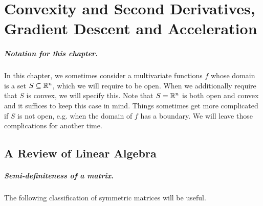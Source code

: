 \chapter{Convexity and Second Derivatives,
  Gradient Descent and Acceleration}
\label{sec:gd}


%
\sloppy

%
%



\paragraph{Notation for this chapter.}
  In this chapter, we sometimes consider a multivariate functions $f$
  whose domain is a set $S \subseteq \mathbb{R}^n$, which we will require to
  be open.
  When we additionally require that $S$ is convex, we will specify this.
  Note that $S = \mathbb{R}^n$ is both open and convex and it suffices to keep
  this case in mind.
  Things sometimes get more complicated if $S$ is not open, e.g. when the
  domain of $f$ has a boundary.
  We will leave those complications for another time.

\section{A Review of Linear Algebra}
\paragraph{Semi-definiteness of a matrix.}  The following classification of symmetric matrices will be useful.

